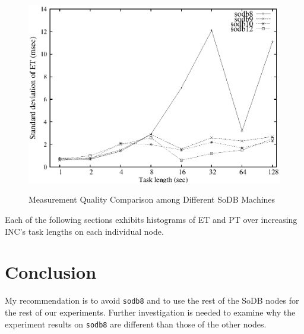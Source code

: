 \documentclass[10pt]{article}
\begin{document}
\begin{figure}[h]
{		\includegraphics[scale=0.6]{overall/machine_pt_std.eps}
        \label{fig:pt_std}
    }
    \caption{Measurement Quality Comparison among Different SoDB Machines}
    \label{fig:machine_comp}
\end{figure}


Each of the following sections exhibits histograms of ET and PT 
over increasing INC's task lengths on each individual node. 








\section{Conclusion}
My recommendation is to avoid {\tt sodb8} and to use the rest of 
the SoDB nodes for the rest of our experiments. Further investigation is 
needed to examine why the experiment results on {\tt sodb8} are different 
than those of the other nodes. 
\end{document}
